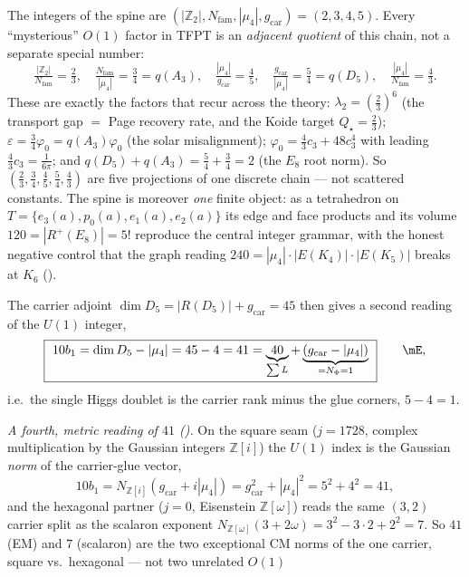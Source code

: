 \documentclass[11pt,a4paper]{article}
\newcommand{\gcar}{g_{\mathrm{car}}}
\newcommand{\Nfam}{N_{\mathrm{fam}}}
\newcommand{\Z}{\mathbb{Z}}
\theoremstyle{definition}
\begin{document}
\begin{keybox}
The integers of the spine are $(|\Z_2|,\Nfam,|\mu_4|,\gcar)=(2,3,4,5)$. Every ``mysterious'' $O(1)$ factor in
TFPT is an \emph{adjacent quotient} of this chain, not a separate special number:
\[
  \tfrac{|\Z_2|}{\Nfam}=\tfrac23,\quad \tfrac{\Nfam}{|\mu_4|}=\tfrac34=q(A_3),\quad
  \tfrac{|\mu_4|}{\gcar}=\tfrac45,\quad \tfrac{\gcar}{|\mu_4|}=\tfrac54=q(D_5),\quad \tfrac{|\mu_4|}{\Nfam}=\tfrac43 .
\]
These are exactly the factors that recur across the theory: $\lambda_2=(\tfrac23)^6$ (the transport gap
$=$ Page recovery rate, and the Koide target $Q_\star=\tfrac23$); $\varepsilon=\tfrac34\varphi_0=q(A_3)\varphi_0$
(the solar misalignment); $\varphi_0=\tfrac43 c_3+48c_3^4$ with leading $\tfrac43 c_3=\tfrac1{6\pi}$; and
$q(D_5){+}q(A_3)=\tfrac54{+}\tfrac34=2$ (the $E_8$ root norm). So $(\tfrac23,\tfrac34,\tfrac45,\tfrac54,\tfrac43)$
are five projections of one discrete chain --- not scattered constants. The spine is moreover \emph{one}
finite object: as a tetrahedron on $T=\{e_3(a),p_0(a),e_1(a),e_2(a)\}$ its edge and face products and its
volume $120=|R^+(E_8)|=5!$ reproduce the central integer grammar, with the honest negative control that
the graph reading $240=|\mu_4|\cdot|E(K_4)|\cdot|E(K_5)|$ breaks at $K_6$
().
\end{keybox} The carrier adjoint $\dim D_5=|R(D_5)|+\gcar=45$
then gives a second reading of the $U(1)$ integer,
\begin{equation}
  \boxed{\ 10b_1=\dim D_5-|\mu_4|=45-4=41=\underbrace{40}_{\sum L}+\underbrace{(\gcar-|\mu_4|)}_{=N_\Phi=1}\ }\qquad\mE ,
\end{equation}
i.e.\ the single Higgs doublet is the carrier rank minus the glue corners, $5-4=1$.
\par\smallskip
\noindent\emph{A fourth, metric reading of $41$ ().} On the square seam
($j{=}1728$, complex multiplication by the Gaussian integers $\Z[i]$) the $U(1)$ index is the Gaussian
\emph{norm} of the carrier-glue vector,
\[
  10b_1=N_{\Z[i]}(\gcar{+}i|\mu_4|)=\gcar^2+|\mu_4|^2=5^2+4^2=41 ,
\]
and the hexagonal partner ($j{=}0$, Eisenstein $\Z[\omega]$) reads the same $(3,2)$ carrier split as the
scalaron exponent $N_{\Z[\omega]}(3{+}2\omega)=3^2{-}3{\cdot}2{+}2^2=7$. So $41$ (EM) and $7$ (scalaron)
are the two exceptional CM norms of the one carrier, square vs.\ hexagonal --- not two unrelated $O(1)$
\end{document}
